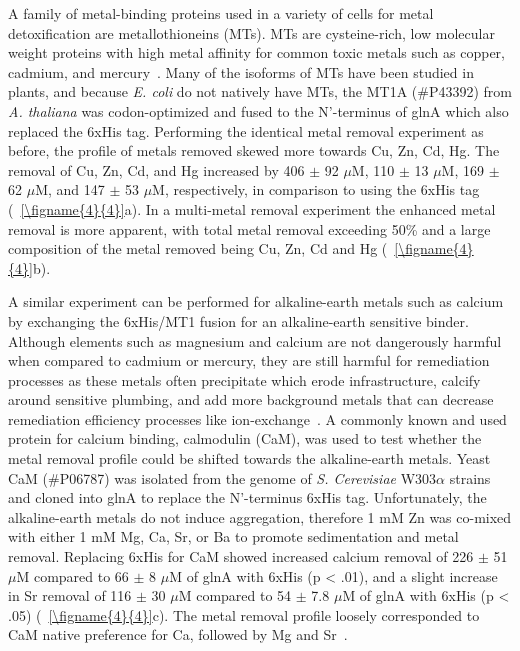 \documentclass[../main/main]{subfiles}
\begin{document}
A family of metal-binding proteins used in a variety of cells for metal detoxification are metallothioneins (MTs). MTs are cysteine-rich, low molecular weight proteins with high metal affinity for common toxic metals such as copper, cadmium, and mercury~\cite{cobbett2002phytochelatins}. Many of the isoforms of MTs have been studied in plants, and because \textit{E. coli} do not natively have MTs, the MT1A (\#{}P43392) from \textit{A. thaliana} was codon-optimized and fused to the N'-terminus of glnA which also replaced the 6xHis tag. Performing the identical metal removal experiment as before, the profile of metals removed skewed more towards Cu, Zn, Cd, Hg. The removal of Cu, Zn, Cd, and Hg increased by
406 $\pm$ 92 $\mu$M,
110 $\pm$ 13 $\mu$M,
169 $\pm$ 62 $\mu$M,
and 147 $\pm$ 53 $\mu$M, respectively, in comparison to using the 6xHis tag (\FIGURE~\ref{\figname{4}{4}}a). In a multi-metal removal experiment the enhanced metal removal is more apparent, with total metal removal exceeding 50\% and a large composition of the metal removed being Cu, Zn, Cd and Hg (\FIGURE~\ref{\figname{4}{4}}b).

A similar experiment can be performed for alkaline-earth metals such as calcium by exchanging the 6xHis/MT1 fusion for an alkaline-earth sensitive binder. Although elements such as magnesium and calcium are not dangerously harmful when compared to cadmium or mercury, they are still harmful for remediation processes as these metals often precipitate which erode infrastructure, calcify around sensitive plumbing, and add more background metals that can decrease remediation efficiency processes like ion-exchange~\cite{greenleaf2006}. A commonly known and used protein for calcium binding, calmodulin (CaM), was used to test whether the metal removal profile could be shifted towards the alkaline-earth metals. Yeast CaM (\#{}P06787) was isolated from the genome of \textit{S. Cerevisiae} W303$\alpha$ strains and cloned into glnA to replace the N'-terminus 6xHis tag. Unfortunately, the alkaline-earth metals do not induce aggregation, therefore 1 mM Zn was co-mixed with either 1 mM Mg, Ca, Sr, or Ba to promote sedimentation and metal removal. Replacing 6xHis for CaM showed increased calcium removal of
226 $\pm$ 51 $\mu$M compared to
66 $\pm$ 8 $\mu$M of glnA with 6xHis (p < .01), and a slight increase in Sr removal of
116 $\pm$ 30 $\mu$M compared to
54 $\pm$ 7.8 $\mu$M of glnA with 6xHis (p < .05) (\FIGURE~\ref{\figname{4}{4}}c).
The metal removal profile loosely corresponded to CaM native preference for Ca, followed by Mg and Sr~\cite{haiech1981}.
\end{document}
